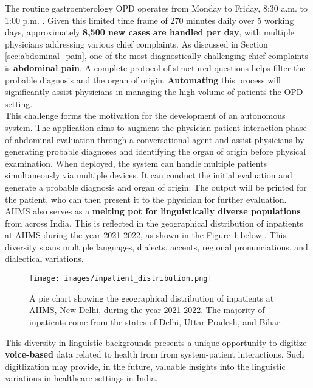 \noindent The routine gastroenterology OPD operates from Monday to Friday, 8:30 a.m. to 1:00 p.m. \cite{AIIMSOPD}. Given this limited time frame of 270 minutes daily over 5 working days, approximately \textcolor{TUMRed}{\textbf{8,500 new cases are handled per day}}, with multiple physicians addressing various chief complaints. As discussed in Section \ref{sec:abdominal_pain}, one of the most diagnostically challenging chief complaints is \textcolor{TUMRed}{\textbf{abdominal pain}}. A complete protocol of structured questions helps filter the probable diagnosis and the organ of origin. \textcolor{TUMRed}{\textbf{Automating}} this process will significantly assist physicians in managing the high volume of patients the OPD setting.\\[\baselineskip]

\noindent This challenge forms the motivation for the development of an autonomous system. The application aims to augment the physician-patient interaction phase of abdominal evaluation through a conversational agent and assist physicians by generating probable diagnoses and identifying the organ of origin before physical examination. When deployed, the system can handle multiple patients simultaneously via multiple devices. It can conduct the initial evaluation and generate a probable diagnosis and organ of origin. The output will be printed for the patient, who can then present it to the physician for further evaluation.\\[\baselineskip]

\noindent AIIMS also serves as a \textcolor{TUMRed}{\textbf{melting pot for linguistically diverse populations}} from across India. This is reflected in the geographical distribution of inpatients at AIIMS during the year 2021-2022, as shown in the Figure \ref{fig:inpatient_distribution} below \cite{AIIMS2024}. This diversity spans multiple languages, dialects, accents, regional pronunciations, and dialectical variations.

\begin{figure}[H]
    \centering
    \texttt{[image: images/inpatient\_distribution.png]}
    \caption{A pie chart showing the geographical distribution of inpatients at AIIMS, New Delhi, during the year 2021-2022. The majority of inpatients come from the states of Delhi, Uttar Pradesh, and Bihar.}
    \label{fig:inpatient_distribution}
\end{figure}

\noindent This diversity in linguistic backgrounds presents a unique opportunity to digitize \textcolor{TUMRed}{\textbf{voice-based}} data related to health from from system-patient interactions. Such digitlization may provide, in the future, valuable insights into the linguistic variations in healthcare settings in India.

